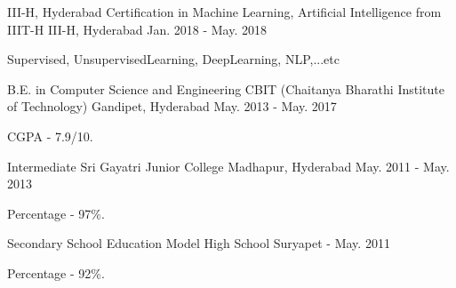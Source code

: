 

\begin{cventries}

 \cventry
    {III-H, Hyderabad} %
    {Certification in Machine Learning, Artificial Intelligence from IIIT-H} %
    {III-H, Hyderabad} %
    {Jan. 2018 - May. 2018} %
    {
      \begin{cvitems} %
         \item {Supervised, UnsupervisedLearning, DeepLearning, NLP,...etc }
      \end{cvitems}
    }
    
  \cventry
    {B.E. in Computer Science and Engineering} %
    {CBIT (Chaitanya Bharathi Institute of Technology)} %
    {Gandipet, Hyderabad} %
    {May. 2013 - May. 2017} %
    {
      \begin{cvitems} %
        \item {CGPA - 7.9/10.}
      \end{cvitems}
    }
    
      \cventry
    {Intermediate} %
    {Sri Gayatri Junior College} %
    {Madhapur, Hyderabad} %
    {May. 2011 - May. 2013} %
    {
      \begin{cvitems} %
        \item {Percentage - 97\%.}
      \end{cvitems}
    }
    
	 \cventry
    {Secondary School Education} %
    {Model High School} %
    {Suryapet} %
    {          - May. 2011} %
    {
      \begin{cvitems} %
        \item {Percentage - 92\%.}
      \end{cvitems}
    }
\end{cventries}
